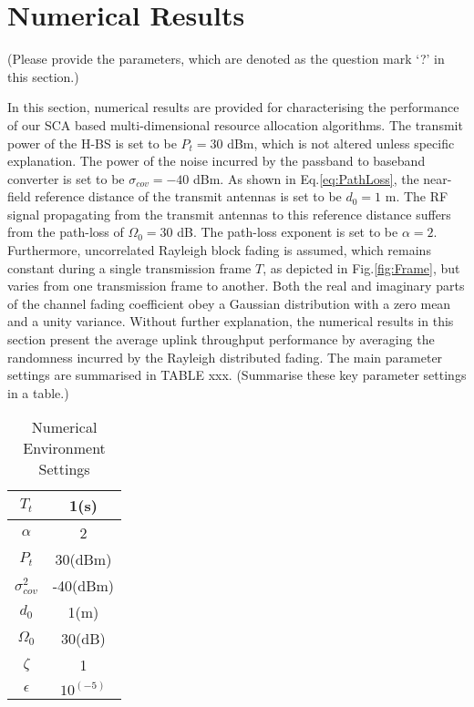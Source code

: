 \documentclass[12pt,draft,onecolumn,journal]{IEEEtran}
\begin{document}
\section{Numerical Results}

{\color{red} (Please provide the parameters, which are denoted as the question mark `?' in this section.)}

In this section, numerical results are provided for characterising the performance of our SCA based multi-dimensional resource allocation algorithms. The transmit power of the H-BS is set to be $P_t = 30$ dBm, which is not altered unless specific explanation. The power of the noise incurred by the passband to baseband converter is set to be $\sigma_{cov} = -40$ dBm. As shown in Eq.\eqref{eq:PathLoss}, the near-field reference distance of the transmit antennas is set to be $d_0 = 1$ m. The RF signal propagating from the transmit antennas to this reference distance suffers from the path-loss of $\Omega_0 = 30$ dB. The path-loss exponent is set to be $\alpha = 2$. Furthermore, uncorrelated Rayleigh block fading is assumed, which remains constant during a single transmission frame $T$, as depicted in Fig.\ref{fig:Frame}, but varies from one transmission frame to another. Both the real and imaginary parts of the channel fading coefficient obey a Gaussian distribution with a zero mean and a unity variance. Without further explanation, the numerical results in this section present the average uplink throughput performance by averaging the randomness incurred by the Rayleigh distributed fading. The main parameter settings are summarised in TABLE xxx. {\color{red} (Summarise these key parameter settings in a table.)}

\begin{table}[!t]
	\caption{Numerical Environment Settings}
	\begin{tabular}{|c|c|}
		\hline
		$T_{t}$ & 1(s)\\
		\hline
		$\alpha$ & 2 \\
		\hline
		$P_t$ & 30(dBm) \\
		\hline
		$\sigma_{cov}^2$ & -40(dBm) \\
		\hline
		$d_0$ & 1(m) \\
		\hline
		$\Omega_0$ & 30(dB) \\
		\hline
		$\zeta$ & 1 \\
		\hline
		$\epsilon$ & $10^{(-5)}$ \\
		\hline
	\end{tabular}
\end{table}
\end{document}
